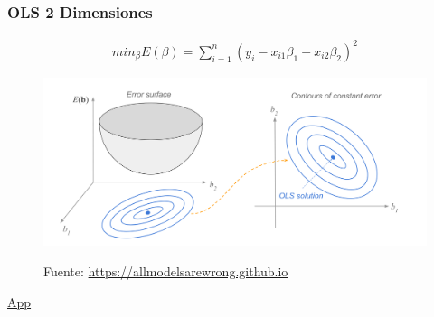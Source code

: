 \documentclass[
  shownotes,
  xcolor={svgnames},
  hyperref={colorlinks,citecolor=DarkBlue,linkcolor=andesred,urlcolor=DarkBlue}
  , aspectratio=169]{beamer}
\begin{document}
\begin{frame}[fragile]
\frametitle{OLS 2 Dimensiones}
\footnotesize
\begin{align}
min_{\beta} E(\beta) = \sum_{i=1}^n (y_i - x_{i1}\beta_1-x_{i2}\beta_2)^2 
\end{align}
\begin{figure}[H] \centering
            \captionsetup{justification=centering}
              \includegraphics[scale=0.4]{figures/ols1}
 
\tiny
Fuente: \url{https://allmodelsarewrong.github.io}
\end{figure}

\href{https://cede.uniandes.edu.co/OLS/}{App}
\end{frame}

\end{document}
